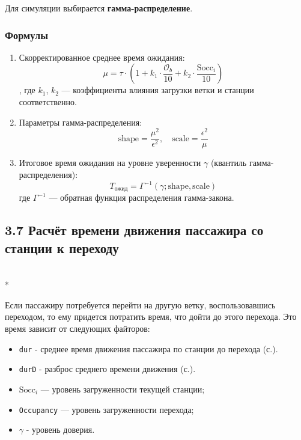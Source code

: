 \documentclass[12pt]{article}
\begin{document}
Для симуляции выбирается \textbf{гамма-распределение}.

\subsubsection*{Формулы}

\begin{enumerate}
  \item Скорректированное среднее время ожидания:
    \begin{equation}
     \mu = \tau \cdot \left(1 + k_1 \cdot \frac{\mathcal{O}_b}{10} + k_2 \cdot \frac{\text{Socc}_i}{10} \right)
    \end{equation},
    где $k_1$, $k_2$ — коэффициенты влияния загрузки ветки и станции соответственно.

\item Параметры гамма-распределения:
$$
\text{shape} = \frac{\mu^2}{\epsilon^2}, \quad
\text{scale} = \frac{\epsilon^2}{\mu}
$$

\item Итоговое время ожидания на уровне уверенности $\gamma$ (квантиль гамма-распределения):
$$
T_{\text{ожид}} = \Gamma^{-1}(\gamma; \text{shape}, \text{scale})
$$
где $\Gamma^{-1}$ — обратная функция распределения гамма-закона.
\end{enumerate}

\subsection*{3.7 Расчёт времени движения пассажира со станции к переходу}\mbox{}\\*

Если пассажиру потребуется перейти на другую ветку, воспользовавшись переходом,
то ему придется потратить время, что дойти до этого перехода. Это время зависит
от следующих файторов:

\begin{itemize}
  \item \texttt{dur} - среднее время движения пассажира по станции до перехода (с.).
  \item \texttt{durD} - разброс среднего времени движения (с.).
  \item $\text{Socc}_i$ — уровень загруженности текущей станции;
  \item \texttt{Occupancy} — уровень загруженности перехода;
  \item $\gamma$ - уровень доверия.
\end{itemize}
\end{document}
